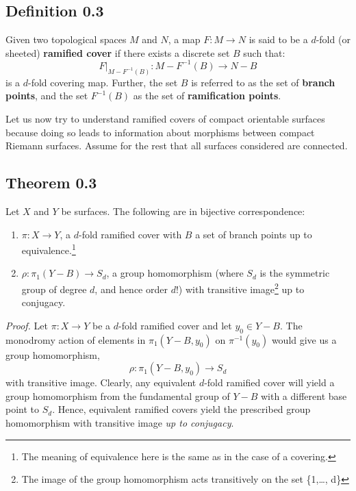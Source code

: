\documentclass[11pt,a4paper]{article}
\begin{document}
\subsection*{Definition 0.3}
    Given two topological spaces $M$ and $N$, a map $F:M\rightarrow N$ is said to be a $d$-fold (or sheeted) \textbf{ramified cover} if there exists a discrete set $B$ such that:
    $$F\big|_{M-F^{-1}(B)}: M-F^{-1}(B) \rightarrow N - B$$
    is a $d$-fold covering map. Further, the set $B$ is referred to as the set of \textbf{branch points}, and the set $F^{-1}(B)$ as the set of \textbf{ramification points}.


Let us now try to understand ramified covers of compact orientable surfaces because doing so leads to information about morphisms between compact Riemann surfaces. Assume for the rest that all surfaces considered are connected.

\subsection*{Theorem 0.3}
    Let $X$ and $Y$ be surfaces. The following are in bijective correspondence:
    \begin{enumerate}
        \item $\pi: X\rightarrow Y$, a $d$-fold ramified cover with $B$ a set of branch points up to equivalence.\footnote{The meaning of equivalence here is the same as in the case of a covering.}
        \item $\rho: \pi_1(Y-B) \rightarrow S_d$, a group homomorphism (where $S_d$ is the symmetric group of degree $d$, and hence order $d!$) with transitive image\footnote{The image of the group homomorphism acts transitively on the set \{1,\ldots, d\}} up to conjugacy.
        \end{enumerate}

\textit{Proof.}
Let $\pi:X \rightarrow Y$ be a $d$-fold ramified cover and let $y_0 \in Y-B$. The monodromy action of elements in $\pi_1(Y-B, y_0)$ on $\pi^{-1}(y_0)$ would give us a group homomorphism,
$$\rho: \pi_1(Y-B, y_0) \rightarrow S_d$$
with transitive image. Clearly, any equivalent $d$-fold ramified cover will yield a group homomorphism from the fundamental group of $Y-B$ with a different base point to $S_d$. Hence, equivalent ramified covers yield the prescribed group homomorphism with transitive image \textit{up to conjugacy}.
\end{document}
